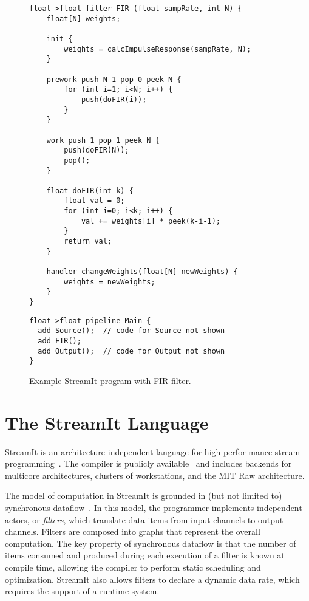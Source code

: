 \begin{figure}[t!]
\eightpoint
\begin{verbatim}
float->float filter FIR (float sampRate, int N) {
    float[N] weights;

    init {
        weights = calcImpulseResponse(sampRate, N);
    }

    prework push N-1 pop 0 peek N {
        for (int i=1; i<N; i++) {
            push(doFIR(i));
        }
    }

    work push 1 pop 1 peek N {
        push(doFIR(N));
        pop();
    }

    float doFIR(int k) {
        float val = 0;
        for (int i=0; i<k; i++) {
            val += weights[i] * peek(k-i-1);
        }
        return val;
    }

    handler changeWeights(float[N] newWeights) {
        weights = newWeights;
    }
}
\end{verbatim}

\begin{minipage}{2.8in}
\begin{verbatim}
float->float pipeline Main {
  add Source();  // code for Source not shown
  add FIR();
  add Output();  // code for Output not shown
}
\end{verbatim}
\end{minipage}
\begin{minipage}{0.5in}
\vspace{-12pt}
\end{minipage}
\vspace{-6pt}
\caption{Example StreamIt program with FIR filter.\protect\label{fig:fir-pipeline}}
\vspace{-6pt}
\end{figure}

\section{The StreamIt Language}

StreamIt is an architecture-independent language for high-perfor-mance
stream programming~\cite{thies-cc02}.  The compiler is publicly
available~\cite{streamitweb} and includes backends for multicore
architectures, clusters of workstations, and the MIT Raw architecture.

The model of computation in StreamIt is grounded in (but not limited
to) synchronous dataflow~\cite{lee87}.  In this model, the programmer
implements independent actors, or {\it filters}, which translate data
items from input channels to output channels.  Filters are composed
into graphs that represent the overall computation.  The key property
of synchronous dataflow is that the number of items consumed and
produced during each execution of a filter is known at compile time,
allowing the compiler to perform static scheduling and optimization.
StreamIt also allows filters to declare a dynamic data rate, which
requires the support of a runtime system.

